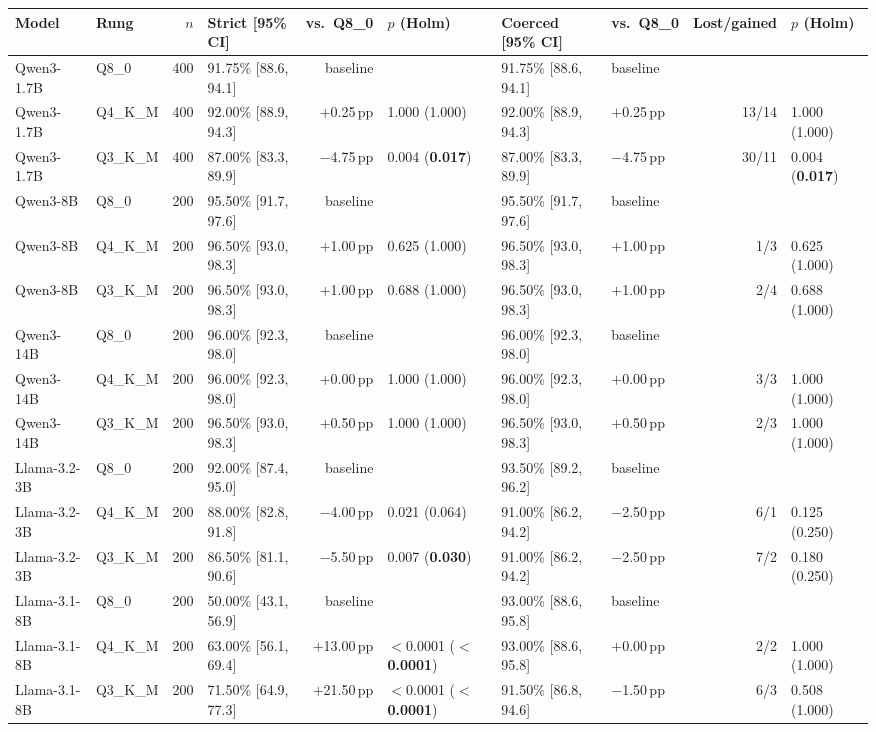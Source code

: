\begin{tabular}{@{}llrlrlllrl@{}}
\toprule
Model & Rung & $n$ & Strict [95\% CI] & vs.\ Q8\_0 & $p$ (Holm) & Coerced [95\% CI] & vs.\ Q8\_0 & Lost/gained & $p$ (Holm) \\
\midrule
Qwen3-1.7B & Q8\_0 & 400 & 91.75\% [88.6, 94.1] & baseline & & 91.75\% [88.6, 94.1] & baseline & & \\
Qwen3-1.7B & Q4\_K\_M & 400 & 92.00\% [88.9, 94.3] & $+$0.25\,pp & 1.000 (1.000) & 92.00\% [88.9, 94.3] & $+$0.25\,pp & 13/14 & 1.000 (1.000) \\
Qwen3-1.7B & Q3\_K\_M & 400 & 87.00\% [83.3, 89.9] & $-$4.75\,pp & 0.004 (\textbf{0.017}) & 87.00\% [83.3, 89.9] & $-$4.75\,pp & 30/11 & 0.004 (\textbf{0.017}) \\
\midrule
Qwen3-8B & Q8\_0 & 200 & 95.50\% [91.7, 97.6] & baseline & & 95.50\% [91.7, 97.6] & baseline & & \\
Qwen3-8B & Q4\_K\_M & 200 & 96.50\% [93.0, 98.3] & $+$1.00\,pp & 0.625 (1.000) & 96.50\% [93.0, 98.3] & $+$1.00\,pp & 1/3 & 0.625 (1.000) \\
Qwen3-8B & Q3\_K\_M & 200 & 96.50\% [93.0, 98.3] & $+$1.00\,pp & 0.688 (1.000) & 96.50\% [93.0, 98.3] & $+$1.00\,pp & 2/4 & 0.688 (1.000) \\
\midrule
Qwen3-14B & Q8\_0 & 200 & 96.00\% [92.3, 98.0] & baseline & & 96.00\% [92.3, 98.0] & baseline & & \\
Qwen3-14B & Q4\_K\_M & 200 & 96.00\% [92.3, 98.0] & $+$0.00\,pp & 1.000 (1.000) & 96.00\% [92.3, 98.0] & $+$0.00\,pp & 3/3 & 1.000 (1.000) \\
Qwen3-14B & Q3\_K\_M & 200 & 96.50\% [93.0, 98.3] & $+$0.50\,pp & 1.000 (1.000) & 96.50\% [93.0, 98.3] & $+$0.50\,pp & 2/3 & 1.000 (1.000) \\
\midrule
Llama-3.2-3B & Q8\_0 & 200 & 92.00\% [87.4, 95.0] & baseline & & 93.50\% [89.2, 96.2] & baseline & & \\
Llama-3.2-3B & Q4\_K\_M & 200 & 88.00\% [82.8, 91.8] & $-$4.00\,pp & 0.021 (0.064) & 91.00\% [86.2, 94.2] & $-$2.50\,pp & 6/1 & 0.125 (0.250) \\
Llama-3.2-3B & Q3\_K\_M & 200 & 86.50\% [81.1, 90.6] & $-$5.50\,pp & 0.007 (\textbf{0.030}) & 91.00\% [86.2, 94.2] & $-$2.50\,pp & 7/2 & 0.180 (0.250) \\
\midrule
Llama-3.1-8B & Q8\_0 & 200 & 50.00\% [43.1, 56.9] & baseline & & 93.00\% [88.6, 95.8] & baseline & & \\
Llama-3.1-8B & Q4\_K\_M & 200 & 63.00\% [56.1, 69.4] & $+$13.00\,pp & $<$0.0001 (\textbf{$<$0.0001}) & 93.00\% [88.6, 95.8] & $+$0.00\,pp & 2/2 & 1.000 (1.000) \\
Llama-3.1-8B & Q3\_K\_M & 200 & 71.50\% [64.9, 77.3] & $+$21.50\,pp & $<$0.0001 (\textbf{$<$0.0001}) & 91.50\% [86.8, 94.6] & $-$1.50\,pp & 6/3 & 0.508 (1.000) \\
\bottomrule
\end{tabular}
